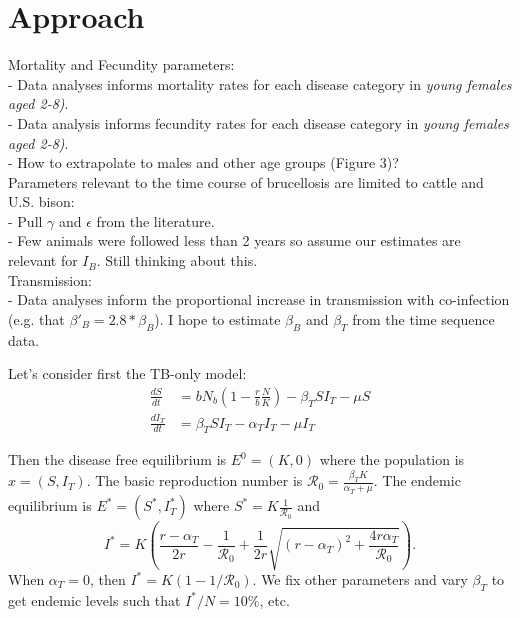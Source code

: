 \documentclass[letterpaper,12pt]{article}
\begin{document}
\section*{Approach}
Mortality and Fecundity parameters: \\
- Data analyses informs mortality rates for each disease category in \textit{young females aged 2-8)}.  \\
- Data analysis informs fecundity rates for each disease category in \textit{young females aged 2-8)}.  \\
- How to extrapolate to males and other age groups (Figure 3)?  \\
Parameters relevant to the time course of brucellosis are limited to cattle and U.S. bison: \\
- Pull $\gamma$ and $\epsilon$ from the literature.  \\
- Few animals were followed less than 2 years so assume our estimates are relevant for $I_B$.  Still thinking about this. \\
Transmission: \\
- Data analyses inform the proportional increase in transmission with co-infection (e.g. that $\beta'_B = 2.8 * \beta_B$).
 I hope to estimate $\beta_B$ and $\beta_T$ from the time sequence data.

\pagebreak



Let's consider first the TB-only model:
\begin{align}
\frac{dS}{dt}&=b N_b\left(1-\frac{r}{b}\frac{N}{K}\right) -\beta_T S I_T - \mu S\\
\frac{dI_T}{dt}&=\beta_T S I_T - \alpha_T I_T - \mu I_T
\end{align}

Then the disease free equilibrium is $E^0=(K,0)$ where the population is $x=(S,I_T)$. The basic reproduction number is $\mathcal{R}_0=\frac{\beta_T K}{\alpha_T + \mu}$. The endemic equilibrium is $E^*=(S^*,I_T^*)$ where $S^*=K\frac{1}{\mathcal{R}_0}$ and 
\begin{equation*}
I^*=K\left( \frac{r-\alpha_T}{2r}-\frac{1}{\mathcal{R}_0} + \frac{1}{2r}\sqrt{(r-\alpha_T)^2 + \frac{4r\alpha_T}{\mathcal{R}_0}}\right).
\end{equation*}
When $\alpha_T=0$, then $I^*=K(1-1/\mathcal{R}_0)$. We fix other parameters and vary $\beta_T$ to get endemic levels such that $I^*/N=10\%$, etc.
\pagebreak



\end{document}

